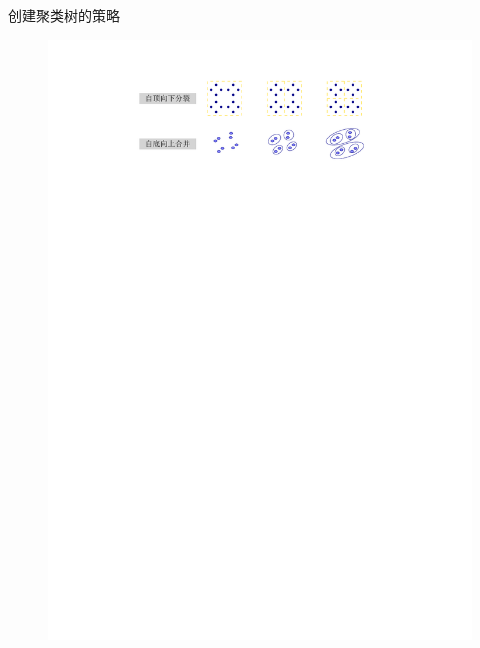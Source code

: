 \textcolor{main1}{创建聚类树的策略}
\begin{figure}[htbp]
    \centering
    \includegraphics{image/创建聚类树的策略.pdf}
\end{figure}

